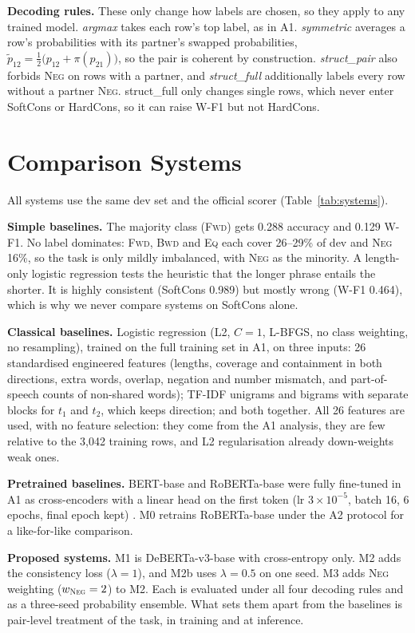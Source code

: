 \documentclass[10pt,a4paper,twocolumn]{article}
\newcommand{\Eq}{\textsc{Eq}}
\newcommand{\Fwd}{\textsc{Fwd}}
\newcommand{\Bwd}{\textsc{Bwd}}
\newcommand{\Neg}{\textsc{Neg}}
\begin{document}
\textbf{Decoding rules.} These only change how labels are chosen, so they apply to any trained model. \emph{argmax} takes each row's top label, as in A1. \emph{symmetric} averages a row's probabilities with its partner's swapped probabilities, $\tilde p_{12}=\tfrac12\big(p_{12}+\pi(p_{21})\big)$, so the pair is coherent by construction. \emph{struct\_pair} also forbids \Neg{} on rows with a partner, and \emph{struct\_full} additionally labels every row without a partner \Neg. struct\_full only changes single rows, which never enter SoftCons or HardCons, so it can raise W-F1 but not HardCons.

\section{Comparison Systems}
\label{sec:comparison}

All systems use the same dev set and the official scorer (Table~\ref{tab:systems}).

\textbf{Simple baselines.} The majority class (\Fwd) gets 0.288 accuracy and 0.129 W-F1. No label dominates: \Fwd, \Bwd{} and \Eq{} each cover 26--29\% of dev and \Neg{} 16\%, so the task is only mildly imbalanced, with \Neg{} as the minority. A length-only logistic regression tests the heuristic that the longer phrase entails the shorter. It is highly consistent (SoftCons 0.989) but mostly wrong (W-F1 0.464), which is why we never compare systems on SoftCons alone.

\textbf{Classical baselines.} Logistic regression (L2, $C=1$, L-BFGS, no class weighting, no resampling), trained on the full training set in A1, on three inputs: 26 standardised engineered features (lengths, coverage and containment in both directions, extra words, overlap, negation and number mismatch, and part-of-speech counts of non-shared words); TF-IDF unigrams and bigrams with separate blocks for $t_1$ and $t_2$, which keeps direction; and both together. All 26 features are used, with no feature selection: they come from the A1 analysis, they are few relative to the 3,042 training rows, and L2 regularisation already down-weights weak ones.

\textbf{Pretrained baselines.} BERT-base and RoBERTa-base were fully fine-tuned in A1 as cross-encoders with a linear head on the first token (lr $3\times10^{-5}$, batch 16, 6 epochs, final epoch kept) \citep{devlin2019bert,liu2019roberta}. M0 retrains RoBERTa-base under the A2 protocol for a like-for-like comparison.

\textbf{Proposed systems.} M1 is DeBERTa-v3-base with cross-entropy only. M2 adds the consistency loss ($\lambda=1$), and M2b uses $\lambda=0.5$ on one seed. M3 adds \Neg{} weighting ($w_{\Neg}=2$) to M2. Each is evaluated under all four decoding rules and as a three-seed probability ensemble. What sets them apart from the baselines is pair-level treatment of the task, in training and at inference.
\end{document}
